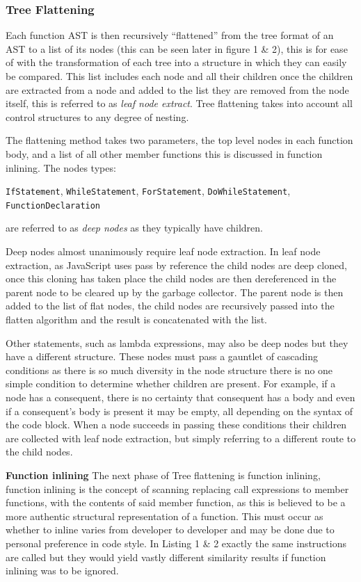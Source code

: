 \documentclass[jou,apacite]{apa6}
\begin{document}
\subsubsection{Tree Flattening}
Each function AST is then recursively “flattened” from the tree format of an AST to a list of its nodes (this can be seen later in figure 1 \& 2), this is for ease of with the transformation of each tree into a structure in which they can easily be compared. This list includes each node and all their children once the children are extracted from a node and added to the list they are removed from the node itself, this is referred to as \textit{leaf node extract}. Tree flattening takes into account all control structures to any degree of nesting. 

The flattening method takes two parameters, the top level nodes in each function body, and a list of all other member functions this is discussed in function inlining. The nodes types:

\texttt{IfStatement}, \texttt{WhileStatement}, \texttt{ForStatement}, \texttt{DoWhileStatement}, \texttt{FunctionDeclaration}

are referred to as \textit{deep nodes} as they typically have children.

Deep nodes almost unanimously require leaf node extraction. In leaf node extraction, as JavaScript uses pass by reference the child nodes are deep cloned, once this cloning has taken place the child nodes are then dereferenced in the parent node to be cleared up by the garbage collector. The parent node is then added to the list of flat nodes, the child nodes are recursively passed into the flatten algorithm and the result is concatenated with the list. 

Other statements, such as lambda expressions, may also be deep nodes but they have a different structure. These nodes must pass a gauntlet of cascading conditions as there is so much diversity in the node structure there is no one simple condition to determine whether children are present. For example, if a node has a consequent, there is no certainty that consequent has a body and even if a consequent's body is present it may be empty, all depending on the syntax of the code block. When a node succeeds in passing these conditions their children are collected with leaf node extraction, but simply referring to a different route to the child nodes. 

\textbf{Function inlining}
The next phase of Tree flattening is function inlining, function inlining is the concept of scanning replacing call expressions to member functions, with the contents of said member function, as this is believed to be a more authentic structural representation of a function. This must occur as whether to inline varies from developer to developer and may be done due to personal preference in code style. In Listing 1 \& 2 exactly the same instructions are called but they would yield vastly different similarity results if function inlining was to be ignored. 
\end{document}
